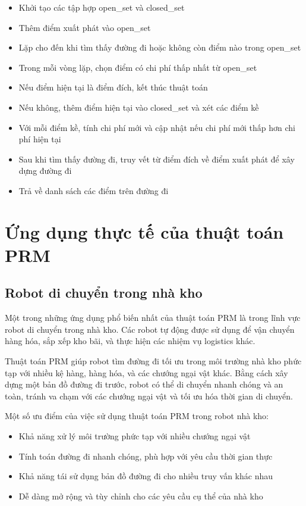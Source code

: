 \documentclass[12pt,a4paper,openany,oneside]{report}
\begin{document}
\begin{itemize}
    \item Khởi tạo các tập hợp open\_set và closed\_set
    \item Thêm điểm xuất phát vào open\_set
    \item Lặp cho đến khi tìm thấy đường đi hoặc không còn điểm nào trong open\_set
    \item Trong mỗi vòng lặp, chọn điểm có chi phí thấp nhất từ open\_set
    \item Nếu điểm hiện tại là điểm đích, kết thúc thuật toán
    \item Nếu không, thêm điểm hiện tại vào closed\_set và xét các điểm kề
    \item Với mỗi điểm kề, tính chi phí mới và cập nhật nếu chi phí mới thấp hơn chi phí hiện tại
    \item Sau khi tìm thấy đường đi, truy vết từ điểm đích về điểm xuất phát để xây dựng đường đi
    \item Trả về danh sách các điểm trên đường đi
\end{itemize}

\chapter{Ứng dụng thực tế của thuật toán PRM}

\section{Robot di chuyển trong nhà kho}

Một trong những ứng dụng phổ biến nhất của thuật toán PRM là trong lĩnh vực robot di chuyển trong nhà kho. Các robot tự động được sử dụng để vận chuyển hàng hóa, sắp xếp kho bãi, và thực hiện các nhiệm vụ logistics khác.

Thuật toán PRM giúp robot tìm đường đi tối ưu trong môi trường nhà kho phức tạp với nhiều kệ hàng, hàng hóa, và các chướng ngại vật khác. Bằng cách xây dựng một bản đồ đường đi trước, robot có thể di chuyển nhanh chóng và an toàn, tránh va chạm với các chướng ngại vật và tối ưu hóa thời gian di chuyển.

Một số ưu điểm của việc sử dụng thuật toán PRM trong robot nhà kho:
\begin{itemize}
    \item Khả năng xử lý môi trường phức tạp với nhiều chướng ngại vật
    \item Tính toán đường đi nhanh chóng, phù hợp với yêu cầu thời gian thực
    \item Khả năng tái sử dụng bản đồ đường đi cho nhiều truy vấn khác nhau
    \item Dễ dàng mở rộng và tùy chỉnh cho các yêu cầu cụ thể của nhà kho
\end{itemize}
\end{document}
